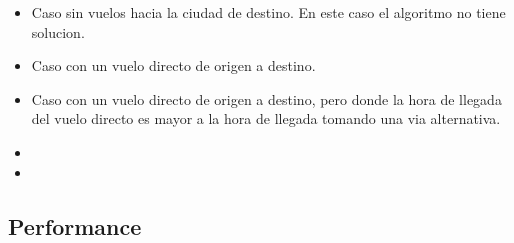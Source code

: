 \begin{itemize}

\item Caso sin vuelos hacia la ciudad de destino. En este caso el algoritmo no tiene solucion.
\item Caso con un vuelo directo de origen a destino.
\item Caso con un vuelo directo de origen a destino, pero donde la hora de llegada del vuelo directo es mayor a la hora de llegada tomando una via alternativa.
\item 
\item 

\end{itemize}


\subsection{Performance}




